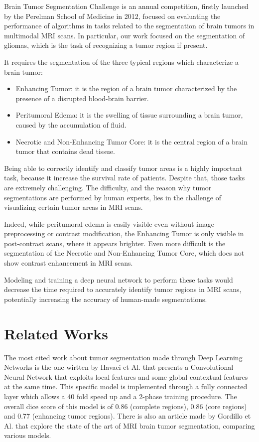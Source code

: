\documentclass[10pt,twocolumn,letterpaper]{article}
\begin{document}
Brain Tumor Segmentation Challenge is an annual competition, firstly launched by the Perelman School of Medicine\cite{BraTSChallenge} in 2012, focused on evaluating the performance of algorithms in tasks related to the segmentation of brain tumors in multimodal MRI scans. In particular, our work focused on the segmentation of gliomas, which is the task of recognizing a tumor region if present.

It requires the segmentation of the three typical regions which characterize a brain tumor:
    \begin{itemize}
        \item Enhancing Tumor: it is the region of a brain tumor characterized by the presence of a disrupted blood-brain barrier.
        \item Peritumoral Edema: it is the swelling of tissue surrounding a brain tumor, caused by the accumulation of fluid.
        \item Necrotic and Non-Enhancing Tumor Core: it is the central region of a brain tumor that contains dead tissue.
\end{itemize}

Being able to correctly identify and classify tumor areas is a highly important task, because it increase the survival rate of patients. Despite that, those tasks are extremely challenging. The difficulty, and the reason why tumor segmentations are performed by human experts, lies in the challenge of visualizing certain tumor areas in MRI scans.

Indeed, while peritumoral edema is easily visible even without image preprocessing or contrast modification, the Enhancing Tumor is only visible in post-contrast scans, where it appears brighter. Even more difficult is the segmentation of the Necrotic and Non-Enhancing Tumor Core, which does not show contrast enhancement in MRI scans.

Modeling and training a deep neural network to perform these tasks would decrease the time required to accurately identify tumor regions in MRI scans, potentially increasing the accuracy of human-made segmentations.

\section{Related Works}

The most cited work about tumor segmentation made through Deep Learning Networks is the one wirtten by Havaei et Al.\cite{HAVAEI201718} that presents a Convolutional Neural Network that exploits local features and some global contextual features at the same time. This specific model is implemented through a fully connected layer which allows a 40 fold speed up and a 2-phase training procedure. The overall dice score of this model is of 0.86 (complete regions), 0.86 (core regions) and 0.77 (enhancing tumor regions).
There is also an article made by Gordillo et Al.\cite{GORDILLO20131426} that explore the state of the art of MRI brain tumor segmentation, comparing various models.
\end{document}
